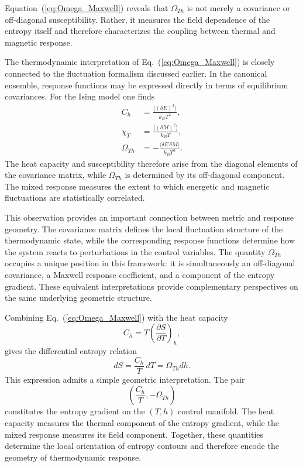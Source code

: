Equation~(\ref{eq:Omega_Maxwell}) reveals that \(\Omega_{Th}\) is not
merely a covariance or off-diagonal susceptibility. Rather, it measures
the field dependence of the entropy itself and therefore characterizes
the coupling between thermal and magnetic response.

The thermodynamic interpretation of Eq.~(\ref{eq:Omega_Maxwell})
is closely connected to the fluctuation formalism discussed
earlier. 
In the canonical ensemble, response functions may be
expressed directly in terms of equilibrium covariances. For the
Ising model one finds
\begin{align}
C_h &=
\frac{\langle (\delta E)^2\rangle}
{k_B T^2},
\\
\chi_T &=
\frac{\langle (\delta M)^2\rangle}
{k_B T},
\\
\Omega_{Th}
&=
-\frac{\langle \delta E\,\delta M\rangle}
{k_B T^2}.
\end{align}
The heat capacity and susceptibility therefore arise from the
diagonal elements of the covariance matrix, while
\(\Omega_{Th}\) is determined by its off-diagonal component.
The mixed response measures the extent to which energetic and
magnetic fluctuations are statistically correlated.

This observation provides an important connection between
metric and response geometry. The covariance matrix defines the
local fluctuation structure of the thermodynamic state, while
the corresponding response functions determine how the system
reacts to perturbations in the control variables. The quantity
\(\Omega_{Th}\) occupies a unique position in this framework:
it is simultaneously an off-diagonal covariance, a Maxwell
response coefficient, and a component of the entropy gradient.
These equivalent interpretations provide complementary
perspectives on the same underlying geometric structure.


Combining Eq.~(\ref{eq:Omega_Maxwell}) with the heat capacity
\begin{equation}
C_h=T\left(
\frac{\partial S}{\partial T}
\right)_h,
\end{equation}
gives the differential entropy relation
\begin{equation}
dS
=
\frac{C_h}{T}\,dT
=
\Omega_{Th}dh.
\label{eq:entropy_gradient}
\end{equation}
This expression admits a simple geometric interpretation. The pair
\begin{equation}
\left(
\frac{C_h}{T} , 
-\Omega_{Th}
\right)
\end{equation}
constitutes the entropy gradient on the \((T,h)\) control manifold.
The heat capacity measures the thermal component of the entropy
gradient, while the mixed response measures its field component.
Together, these quantities determine the local orientation of entropy
contours and therefore encode the geometry of thermodynamic response.

